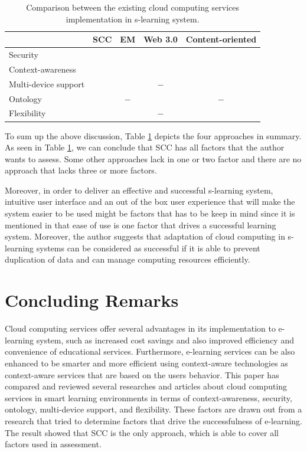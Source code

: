 \documentclass[journal]{vgtc}
\newcommand{\cmark}{\ding{51}}%
\begin{document}
\begin{table}[htb]
  \caption{Comparison between the existing cloud computing services implementation in s-learning system.}
  \label{tab:comparison}
  \scriptsize
  \begin{center}
  \begin{tabular}{lcccc}
     & SCC & EM & Web 3.0 & Content-oriented \\
    \hline
    Security & \cmark & \cmark & \cmark & \cmark \\
    Context-awareness & \cmark & \cmark & \cmark & \cmark \\
    Multi-device support & \cmark & \cmark & $-$ & \cmark \\
    Ontology & \cmark & $-$ & \cmark &  $-$ \\
    Flexibility & \cmark & \cmark &  $-$ & \cmark
  \end{tabular}
  \end{center}
\end{table}

To sum up the above discussion, Table \ref{tab:comparison} depicts the four approaches in summary. As seen in Table \ref{tab:comparison}, we can conclude that SCC has all factors that the author wants to assess. Some other approaches lack in one or two factor and there are no approach that lacks three or more factors.

Moreover, in order to deliver an effective and successful s-learning system, intuitive user interface and an out of the box user experience that will make the system easier to be used might be factors that has to be keep in mind since it is mentioned in \cite{Sun2008} that ease of use is one factor that drives a successful learning system. Moreover, the author suggests that adaptation of cloud computing in s-learning systems can be considered as successful if it is able to prevent duplication of data and can manage computing resources efficiently.

\section{Concluding Remarks}
Cloud computing services offer several advantages in its implementation to e-learning system, such as increased cost savings and also improved efficiency and convenience of educational services. Furthermore, e-learning services can be also enhanced to be smarter and more efficient using context-aware technologies as context-aware services that are based on the users behavior. This paper has compared and reviewed several researches and articles about cloud computing services in smart learning environments in terms of context-awareness, security, ontology, multi-device support, and flexibility. These factors are drawn out from a research that tried to determine factors that drive the successfulness of e-learning. The result showed that SCC is the only approach, which is able to cover all factors used in assessment.
\end{document}

